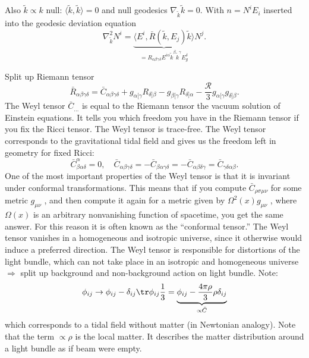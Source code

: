 	Also $\tilde{k} \propto k $ null: $\langle \tilde{k},\tilde{k} \rangle =0$ and null geodesics $\nabla_{\tilde{k}} \tilde{k} =0$. With $n = N^i E_i$ inserted into the geodesic deviation equation
	\begin{equation}
		\nabla^2_{\tilde{k}} N^i =\underbrace{ \langle E^i, \bar{R}(\tilde{k},E_j) \tilde{k} \rangle}_{=R_{\alpha \beta \gamma \delta} E^{i \alpha} \tilde{k}^{\beta} \tilde{k}^{\gamma} E^{\delta}_g} N^j .
	\end{equation}
\begin{mybox}{Split up Riemann tensor }
	\begin{equation}
		\bar{R}_{\alpha \beta \gamma \delta} = \bar{C}_{\alpha \beta \gamma \delta} + g_{\alpha [\gamma} R_{\delta ] \beta} - g_{\beta [\gamma} R_{\delta] \alpha} - \frac{\mathcal{R}}{3} g_{\alpha [\gamma} g_{\delta] \beta}.
	\end{equation}
	The Weyl tensor $\bar{C}_{\dots}$ is equal to the Riemann tensor the vacuum solution of Einstein equations. It tells you which freedom you have in the Riemann tensor if you fix the Ricci tensor. The Weyl tensor is trace-free. The Weyl tensor corresponds to the gravitational tidal field and gives us the freedom left in geometry for fixed Ricci:
	\begin{equation}
		\bar{C}^{\alpha}_{\beta \alpha \delta} = 0, \quad \bar{C}_{\alpha \beta \gamma \delta} = - \bar{C}_{\beta \alpha \gamma \delta} = - \bar{C}_{\alpha \beta \delta \gamma}= \bar{C}_{\gamma\delta \alpha \beta}.
	\end{equation}
	One of the most important properties of the Weyl tensor is that it is invariant under conformal transformations. This means that if you compute $\bar{C}_{ρσμν}$ for some metric $g_{μν}$ , and then
	compute it again for a metric given by $Ω^2 (x) g_{μν}$ , where $Ω(x)$ is an arbitrary nonvanishing
	function of spacetime, you get the same answer. For this reason it is often known as the
	“conformal tensor.”
	The Weyl tensor vanishes in a homogeneous and isotropic universe, since it otherwise would induce a preferred direction. The Weyl tensor is responsible for distortions of the light bundle, which can not take place in an isotropic and homogeneous universe $\Rightarrow$ split up background and non-background action on light bundle.
	Note:
	\begin{equation}
		\phi_{ij} \rightarrow \phi_{ij} - \delta_{ij}\tr \phi_{ij} \frac{1}{3} = \underbrace{\phi_{ij}- \frac{4 \pi \rho}{3} \rho \delta_{ij}}_{\propto \bar{C}}
	\end{equation}
	which corresponds to a tidal field without matter (in Newtonian analogy). Note that the term $\propto \rho$ is the local matter. It describes the matter distribution around a light bundle as if beam were empty.
\end{mybox}
